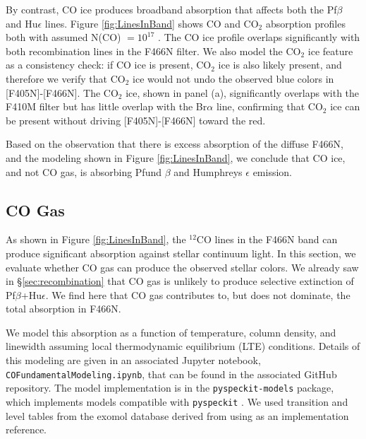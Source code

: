 \documentclass[times,astrosymb,twocolumn]{aastex631}
\def\todo#1{\textcolor{red}{#1}}
\newcommand\hue{Hu\ensuremath{\epsilon}\xspace}
\def\rr#1{#1}
\begin{document}
By contrast, CO ice produces broadband absorption that affects both the Pf$\beta$ and Hu$\epsilon$ lines.
Figure \ref{fig:LinesInBand} shows CO and CO$_2$ absorption profiles both with assumed {N(CO) $=10^{17}$ \persc}.
The CO ice profile overlaps significantly with both recombination lines in the F466N filter.
\rr{We also model the CO$_2$ ice feature as a consistency check: if CO ice is present, CO$_2$ ice is also likely present, and therefore we verify that CO$_2$ ice would not undo the observed blue colors in [F405N]-[F466N].}
The CO$_2$ ice, shown in panel (a), significantly \rr{overlaps with the} F410M filter but has little \rr{overlap with} the Br$\alpha$ line\rr{, confirming that CO$_2$ ice can be present without driving [F405N]-[F466N] toward the red}.

Based on the observation that there is excess absorption of the diffuse F466N, \rr{and the modeling shown in Figure \ref{fig:LinesInBand},} we conclude that CO ice, and not CO gas, is absorbing Pfund $\beta$ and Humphreys $\epsilon$ emission.





\subsection{CO Gas}
\label{sec:cogas}
As shown in Figure \ref{fig:LinesInBand}, the $^{12}$CO lines in the F466N band can produce significant absorption against stellar continuum light.
In this section, we evaluate whether CO gas can produce the observed stellar colors.
We already saw in \S \ref{sec:recombination} that CO gas is unlikely to produce selective extinction of Pf$\beta$+\hue.
We find here that CO gas contributes to, but does not dominate, the total absorption in F466N.

We model this absorption as a function of temperature, column density, and linewidth assuming local thermodynamic equilibrium (LTE) conditions.
Details of this modeling are given in an associated Jupyter notebook, \texttt{COFundamentalModeling.ipynb}, that can be found in the associated GitHub repository.
The model implementation is in the \texttt{pyspeckit-models} package, which implements models compatible with \texttt{pyspeckit} \citep{Ginsburg2022}.
We used transition and level tables from the exomol database \citep{Tennyson2016} derived from \citet{Li2015} using \citet{Yurchenko2018} as an implementation reference.
\end{document}
